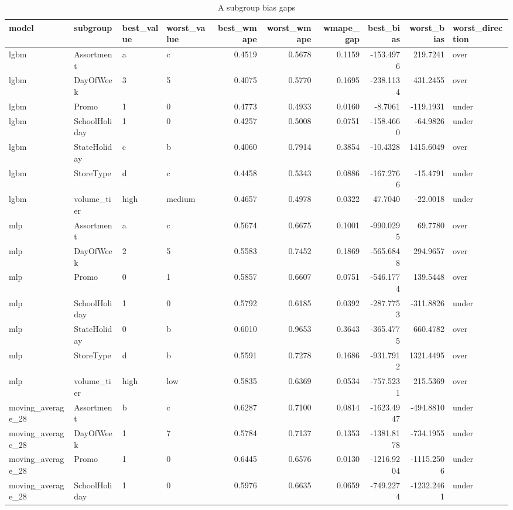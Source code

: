 \begin{table}
\caption{A subgroup bias gaps}
\label{tab:bias-gaps-A}
\begin{tabular}{llllrrrrrl}
\toprule
model & subgroup & best\_value & worst\_value & best\_wmape & worst\_wmape & wmape\_gap & best\_bias & worst\_bias & worst\_direction \\
\midrule
lgbm & Assortment & a & c & 0.4519 & 0.5678 & 0.1159 & -153.4976 & 219.7241 & over \\
lgbm & DayOfWeek & 3 & 5 & 0.4075 & 0.5770 & 0.1695 & -238.1134 & 431.2455 & over \\
lgbm & Promo & 1 & 0 & 0.4773 & 0.4933 & 0.0160 & -8.7061 & -119.1931 & under \\
lgbm & SchoolHoliday & 1 & 0 & 0.4257 & 0.5008 & 0.0751 & -158.4660 & -64.9826 & under \\
lgbm & StateHoliday & c & b & 0.4060 & 0.7914 & 0.3854 & -10.4328 & 1415.6049 & over \\
lgbm & StoreType & d & c & 0.4458 & 0.5343 & 0.0886 & -167.2766 & -15.4791 & under \\
lgbm & volume\_tier & high & medium & 0.4657 & 0.4978 & 0.0322 & 47.7040 & -22.0018 & under \\
mlp & Assortment & a & c & 0.5674 & 0.6675 & 0.1001 & -990.0295 & 69.7780 & over \\
mlp & DayOfWeek & 2 & 5 & 0.5583 & 0.7452 & 0.1869 & -565.6848 & 294.9657 & over \\
mlp & Promo & 0 & 1 & 0.5857 & 0.6607 & 0.0751 & -546.1774 & 139.5448 & over \\
mlp & SchoolHoliday & 1 & 0 & 0.5792 & 0.6185 & 0.0392 & -287.7753 & -311.8826 & under \\
mlp & StateHoliday & 0 & b & 0.6010 & 0.9653 & 0.3643 & -365.4775 & 660.4782 & over \\
mlp & StoreType & d & b & 0.5591 & 0.7278 & 0.1686 & -931.7912 & 1321.4495 & over \\
mlp & volume\_tier & high & low & 0.5835 & 0.6369 & 0.0534 & -757.5231 & 215.5369 & over \\
moving\_average\_28 & Assortment & b & c & 0.6287 & 0.7100 & 0.0814 & -1623.4947 & -494.8810 & under \\
moving\_average\_28 & DayOfWeek & 1 & 7 & 0.5784 & 0.7137 & 0.1353 & -1381.8178 & -734.1955 & under \\
moving\_average\_28 & Promo & 1 & 0 & 0.6445 & 0.6576 & 0.0130 & -1216.9204 & -1115.2506 & under \\
moving\_average\_28 & SchoolHoliday & 1 & 0 & 0.5976 & 0.6635 & 0.0659 & -749.2274 & -1232.2461 & under \\

\end{tabular}
\end{table}
